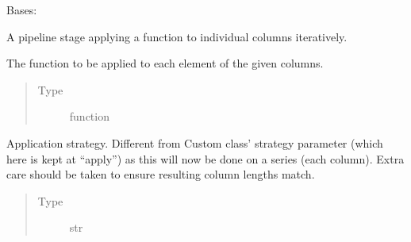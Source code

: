 \documentclass[letterpaper,10pt,english]{sphinxmanual}
\begin{document}
\begin{fulllineitems}
\label{\detokenize{dalio.pipe:dalio.pipe.CustomByCols}}
Bases: {\hyperref[\detokenize{dalio.pipe:dalio.pipe.col_generation.Custom}]{}}

A pipeline stage applying a function to individual columns iteratively.

\begin{fulllineitems}
\label{\detokenize{dalio.pipe:dalio.pipe.CustomByCols.func}}
The function to be applied to each element of the
given columns.
\begin{quote}\begin{description}
\item[{Type}] \leavevmode
function

\end{description}\end{quote}

\end{fulllineitems}


\begin{fulllineitems}
\label{\detokenize{dalio.pipe:dalio.pipe.CustomByCols.strategy}}
Application strategy. Different from Custom class’
strategy parameter (which here is kept at “apply”) as this will
now be done on a series (each column). Extra care should be taken
to ensure resulting column lengths match.
\begin{quote}\begin{description}
\item[{Type}] \leavevmode
str

\end{description}\end{quote}

\end{fulllineitems}


\end{fulllineitems}
\end{document}
